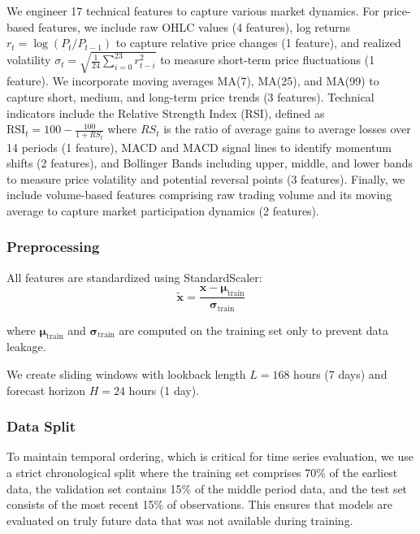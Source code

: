 \documentclass[11pt,a4paper]{article}
\begin{document}
We engineer 17 technical features to capture various market dynamics. For price-based features, we include raw OHLC values (4 features), log returns $r_t = \log(P_t / P_{t-1})$ to capture relative price changes (1 feature), and realized volatility $\sigma_t = \sqrt{\frac{1}{24}\sum_{i=0}^{23}r_{t-i}^2}$ to measure short-term price fluctuations (1 feature). We incorporate moving averages MA(7), MA(25), and MA(99) to capture short, medium, and long-term price trends (3 features). Technical indicators include the Relative Strength Index (RSI), defined as $\text{RSI}_t = 100 - \frac{100}{1 + RS_t}$ where $RS_t$ is the ratio of average gains to average losses over 14 periods (1 feature), MACD and MACD signal lines to identify momentum shifts (2 features), and Bollinger Bands including upper, middle, and lower bands to measure price volatility and potential reversal points (3 features). Finally, we include volume-based features comprising raw trading volume and its moving average to capture market participation dynamics (2 features).

\subsubsection{Preprocessing}

All features are standardized using StandardScaler:
\begin{equation}
    \tilde{\mathbf{x}} = \frac{\mathbf{x} - \boldsymbol{\mu}_{\text{train}}}{\boldsymbol{\sigma}_{\text{train}}}
\end{equation}

where $\boldsymbol{\mu}_{\text{train}}$ and $\boldsymbol{\sigma}_{\text{train}}$ are computed on the training set only to prevent data leakage.

We create sliding windows with lookback length $L = 168$ hours (7 days) and forecast horizon $H = 24$ hours (1 day).

\subsubsection{Data Split}

To maintain temporal ordering, which is critical for time series evaluation, we use a strict chronological split where the training set comprises 70\% of the earliest data, the validation set contains 15\% of the middle period data, and the test set consists of the most recent 15\% of observations. This ensures that models are evaluated on truly future data that was not available during training.
\end{document}
